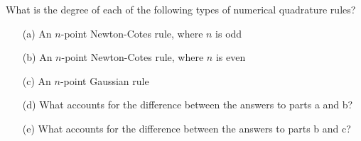 \begin{pro}
  What is the degree of each of the following types of numerical quadrature rules?
  \begin{itemize}
  \item[(a)]
    An $n$-point Newton-Cotes rule,
    where $n$ is odd

  \item[(b)]
    An $n$-point Newton-Cotes rule,
    where $n$ is even

  \item[(c)]
    An $n$-point Gaussian rule

  \item[(d)]
    What accounts for the difference between the answers to parts a and b?

  \item[(e)]
    What accounts for the difference between the answers to parts b and c?
  \end{itemize}
\end{pro}

